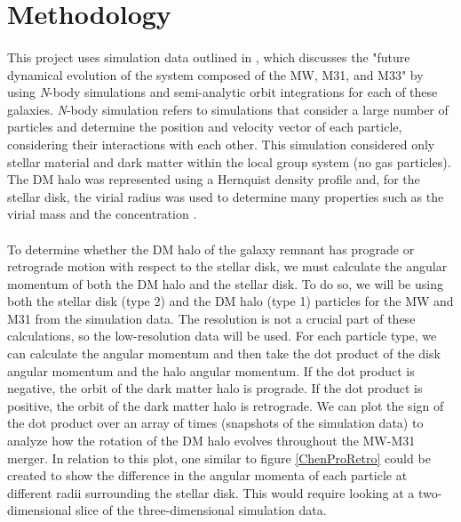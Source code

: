 \documentclass[fleqn,usenatbib]{mnras}
\begin{document}
\section{Methodology}

\paragraph{} This project uses simulation data outlined in \cite{Marel+2012}, which discusses the "future dynamical evolution of the system composed of the MW, M31, and M33" \citep{Marel+2012} by using \textit{N}-body simulations and semi-analytic orbit integrations for each of these galaxies. \textit{N}-body simulation refers to simulations that consider a large number of particles and determine the position and velocity vector of each particle, considering their interactions with each other. This simulation considered only stellar material and dark matter within the local group system (no gas particles). The DM halo was represented using a Hernquist density profile and, for the stellar disk, the virial radius was used to determine many properties such as the virial mass and the concentration \citep{Marel+2012}.

\paragraph{} To determine whether the DM halo of the galaxy remnant has prograde or retrograde motion with respect to the stellar disk, we must calculate the angular momentum of both the DM halo and the stellar disk. To do so, we will be using both the stellar disk (type 2) and the DM halo (type 1) particles for the MW and M31 from the simulation data. The resolution is not a crucial part of these calculations, so the low-resolution data will be used. For each particle type, we can calculate the angular momentum and then take the dot product of the disk angular momentum and the halo angular momentum. If the dot product is negative, the orbit of the dark matter halo is prograde. If the dot product is positive, the orbit of the dark matter halo is retrograde. We can plot the sign of the dot product over an array of times (snapshots of the simulation data) to analyze how the rotation of the DM halo evolves throughout the MW-M31 merger. In relation to this plot, one similar to figure \ref{ChenProRetro} could be created to show the difference in the angular momenta of each particle at different radii surrounding the stellar disk. This would require looking at a two-dimensional slice of the three-dimensional simulation data.
\end{document}
